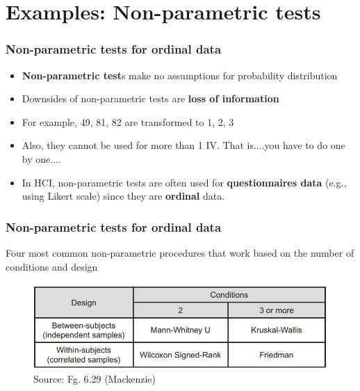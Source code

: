 \documentclass{beamer}
\begin{document}
\section{Examples: Non-parametric tests} %

\begin{frame}
	\frametitle{Non-parametric tests for ordinal data} 
	\begin{itemize}
		\item \textbf{Non-parametric test}s make no assumptions for probability distribution%
		\item Downsides of non-parametric tests are \textbf{loss of information} %
		\item For example, 49, 81, 82 are transformed to 1, 2, 3
		\item Also, they cannot be used for more than 1 IV.  That is....you have to do one by one....
		\item In HCI, non-parametric tests are often used for \textbf{questionnaires data} (e.g., using Likert scale) since they are \textbf{ordinal} data.  %
	\end{itemize}
\end{frame}

\begin{frame}
	\frametitle{Non-parametric tests for ordinal data} 
	Four most common non-parametric procedures that work based on the number of conditions and design %
	\begin{figure}
		\includegraphics[width=0.9\linewidth]{6-29}
		\caption{Source: Fg. 6.29 (Mackenzie)}
	\end{figure}
\end{frame}
\end{document}
